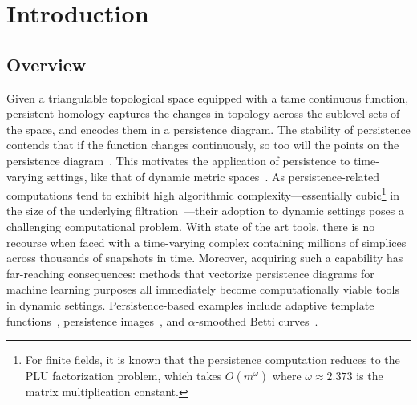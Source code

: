 \documentclass[sn-mathphys]{sn-jnl}
\begin{document}
\maketitle

\section{Introduction} 
\subsection{Overview}\label{sec:overview} 
Given a triangulable topological space equipped with a tame continuous function, persistent homology captures the changes in topology across the sublevel sets of the space, and encodes them in a persistence diagram. The stability of persistence contends that   if the function changes continuously, so too will the points on the persistence diagram~\cite{cohen2007stability, cohen2006vines}. 
This motivates the  application of persistence to time-varying  settings, like that of dynamic metric spaces~\cite{kim2020spatiotemporal}. 
As persistence-related computations tend to exhibit high algorithmic complexity---essentially cubic\footnote{For finite fields, it is known that the persistence computation reduces to the PLU factorization problem, which takes $O(m^\omega)$ where $\omega \approx 2.373$ is the matrix multiplication constant.} in the size of the underlying filtration~\cite{morozov2005persistence}---their adoption to dynamic settings poses a challenging computational problem.
With state of the art tools, there is no recourse when faced with a time-varying complex containing millions of simplices across thousands of snapshots in time.
Moreover, acquiring such a capability has far-reaching consequences: methods that vectorize persistence diagrams for machine learning purposes all immediately become computationally viable tools in dynamic settings. Persistence-based examples include adaptive template functions~\cite{polanco2019adaptive}, persistence images~\cite{adams2017persistence}, and $\alpha$-smoothed Betti curves~\cite{ulmer2019topological}. 
  
\end{document}
